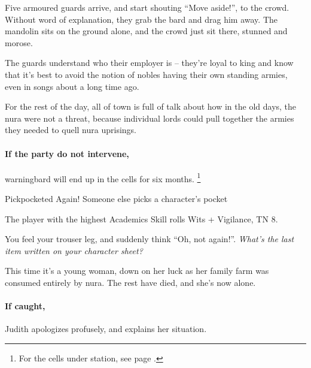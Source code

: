 \begin{multicols}{2}
\begin{boxtext}

	Five armoured guards arrive, and start shouting ``Move aside!'', to the crowd.  Without word of explanation, they grab the bard and drag him away.  The mandolin sits on the ground alone, and the crowd just sit there, stunned and morose.

\end{boxtext}

The guards understand who their employer is -- they're loyal to \gls{king} and know that it's best to avoid the notion of nobles having their own standing armies, even in songs about a long time ago.

For the rest of the day, all of \gls{town} is full of talk about how in the old days, the nura were not a threat, because individual lords could pull together the armies they needed to quell nura uprisings.

\paragraph{If the party do not intervene,}
\gls{warningbard} will end up in the cells for six months.
\footnote{For the cells under  station, see page \pageref{guardstation}.}

\warningbard

{Pickpocketed Again!}%
{Someone else picks a character's pocket}%

The player with the highest Academics Skill rolls Wits + Vigilance, TN 8.

\begin{boxtext}

	You feel your trouser leg, and suddenly think ``Oh, not again!''.  \textit{What's the last item written on your character sheet?}

\end{boxtext}

This time it's a young woman, down on her luck as her family farm was consumed entirely by nura.
The rest have died, and she's now alone.

\paragraph{If caught,}
Judith apologizes profusely, and explains her situation.



\end{multicols}

\stopcontents[Town]
\stopcontents[sq]
